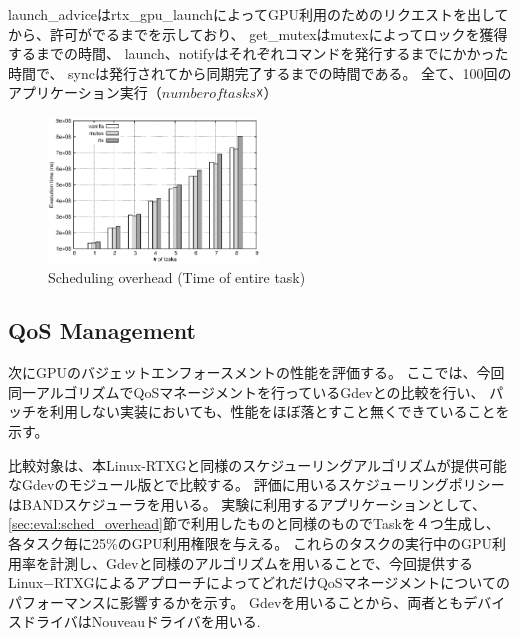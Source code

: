 
launch\_adviceはrtx\_gpu\_launchによってGPU利用のためのリクエストを出してから、許可がでるまでを示しており、
get\_mutexはmutexによってロックを獲得するまでの時間、
launch、notifyはそれぞれコマンドを発行するまでにかかった時間で、
syncは発行されてから同期完了するまでの時間である。
全て、100回のアプリケーション実行（$number of tasks ☓$）

\begin{figure}[t]
\begin{center}
\includegraphics[width=0.5\textwidth]{img/sum_task.eps}
\caption{Scheduling overhead (Time of entire task)}
\end{center}
\label{fig:fp_overhead}
\end{figure}


\subsection{QoS Management}

次にGPUのバジェットエンフォースメントの性能を評価する。
ここでは、今回同一アルゴリズムでQoSマネージメントを行っているGdevとの比較を行い、
パッチを利用しない実装においても、性能をほぼ落とすこと無くできていることを示す。

比較対象は、本Linux-RTXGと同様のスケジューリングアルゴリズムが提供可能なGdevのモジュール版とで比較する。
評価に用いるスケジューリングポリシーはBANDスケジューラを用いる。
実験に利用するアプリケーションとして、\ref{sec:eval:sched_overhead}節で利用したものと同様のものでTaskを４つ生成し、各タスク毎に25\%のGPU利用権限を与える。
これらのタスクの実行中のGPU利用率を計測し、Gdevと同様のアルゴリズムを用いることで、今回提供するLinux−RTXGによるアプローチによってどれだけQoSマネージメントについてのパフォーマンスに影響するかを示す。
Gdevを用いることから、両者ともデバイスドライバはNouveauドライバを用いる.

